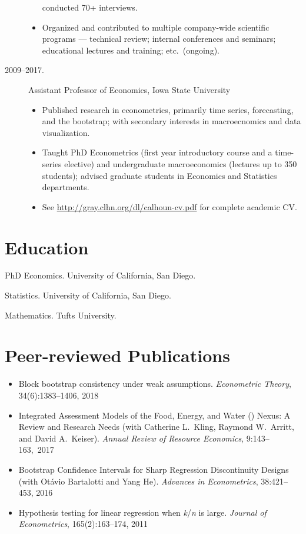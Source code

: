 \documentclass[10pt]{safecv}%
\begin{document}
\begin{description}
\begin{itemize}
    conducted 70+ interviews.
  \item Organized and contributed to multiple company-wide scientific
    programs --- technical review; internal conferences and seminars;
    educational lectures and training; etc.\ (ongoing).
  \end{itemize}
\item[2009--2017.] Assistant Professor of Economics, Iowa State University
  \begin{itemize}
  \item Published research in econometrics, primarily time
    series, forecasting, and the bootstrap; with secondary interests
    in macroecnomics and data visualization.
   \item Taught PhD Econometrics (first year introductory course and
     a time-series elective) and undergraduate macroeconomics (lectures up to 350 students); advised
     graduate students in Economics and Statistics departments.
   \item See \url{http://gray.clhn.org/dl/calhoun-cv.pdf} for complete
     academic CV.
   \end{itemize}
\end{description}

\section*{Education}

\begin{description}[noitemsep]
\item[2009.] PhD Economics. University of California, San Diego.
\item[2006.]  Statistics. University of California, San Diego.
\item[2001.]  Mathematics. Tufts University.
\end{description}

\section*{Peer-reviewed Publications}

\begin{itemize}[noitemsep]
\item Block bootstrap consistency under weak assumptions.
  \textit{Econometric Theory}, 34(6):1383--1406, 2018
\item Integrated Assessment Models of the Food, Energy, and Water
  () Nexus: A Review and Research Needs (with Catherine
  L.\ Kling, Raymond W.\ Arritt, and David A.\ Keiser). \textit{Annual
    Review of Resource Economics}, 9:143--163,~2017
\item Bootstrap Confidence Intervals for Sharp Regression
  Discontinuity Designs (with Ot\'avio Bartalotti and Yang
  He). \textit{Advances in Econometrics}, 38:421--453, 2016
\item Hypothesis testing for linear regression when
  \textit{k}/\textit{n} is large. \textit{Journal of Econometrics},
  165(2):163--174, 2011
\end{itemize}
\end{document}
